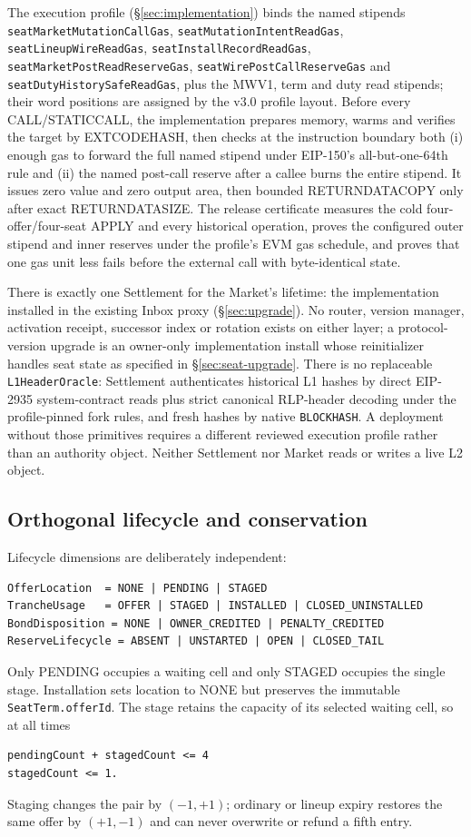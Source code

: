 \documentclass[a4paper,11pt]{article}
\newcommand{\code}[1]{\nolinkurl{#1}}
\begin{document}
The execution profile (\S\ref{sec:implementation}) binds the named stipends
\code{seatMarketMutationCallGas}, \code{seatMutationIntentReadGas},
\code{seatLineupWireReadGas}, \code{seatInstallRecordReadGas},
\code{seatMarketPostReadReserveGas}, \code{seatWirePostCallReserveGas} and
\code{seatDutyHistorySafeReadGas}, plus the MWV1, term and duty read stipends;
their word positions are assigned by the v3.0 profile layout.  Before every
CALL/STATICCALL, the implementation prepares memory,
warms and verifies the target by EXTCODEHASH, then checks at the instruction
boundary both (i) enough gas to forward the full named stipend under EIP-150's
all-but-one-64th rule and (ii) the named post-call reserve after a callee burns
the entire stipend.  It issues zero value and zero output area, then bounded
RETURNDATACOPY only after exact RETURNDATASIZE.  The release certificate measures
the cold four-offer/four-seat APPLY and every historical operation,
proves the configured outer stipend and inner reserves under the profile's EVM
gas schedule, and proves that one gas unit less fails before the external call
with byte-identical state.

There is exactly one Settlement for the Market's lifetime: the implementation
installed in the existing Inbox proxy (\S\ref{sec:upgrade}).  No router,
version manager, activation receipt, successor index or rotation exists on
either layer; a protocol-version upgrade is an owner-only implementation
install whose reinitializer handles seat state as specified in
\S\ref{sec:seat-upgrade}.  There is no replaceable \code{L1HeaderOracle}:
Settlement authenticates historical L1 hashes by direct EIP-2935
system-contract reads plus strict canonical RLP-header decoding under the
profile-pinned fork rules, and fresh hashes by native \code{BLOCKHASH}.  A
deployment without those primitives requires a different reviewed execution
profile rather than an authority object.  Neither Settlement nor Market reads
or writes a live L2 object.

\subsection{Orthogonal lifecycle and conservation}

Lifecycle dimensions are deliberately independent:
\begin{verbatim}
OfferLocation  = NONE | PENDING | STAGED
TrancheUsage   = OFFER | STAGED | INSTALLED | CLOSED_UNINSTALLED
BondDisposition = NONE | OWNER_CREDITED | PENALTY_CREDITED
ReserveLifecycle = ABSENT | UNSTARTED | OPEN | CLOSED_TAIL
\end{verbatim}
Only PENDING occupies a waiting cell and only STAGED occupies the single stage.
Installation sets location to NONE but preserves the immutable
\code{SeatTerm.offerId}.  The stage retains the capacity of its selected waiting
cell, so at all times
\begin{verbatim}
pendingCount + stagedCount <= 4
stagedCount <= 1.
\end{verbatim}
Staging changes the pair by $(-1,+1)$; ordinary or lineup expiry restores the
same offer by $(+1,-1)$ and can never overwrite or refund a fifth entry.
\end{document}

